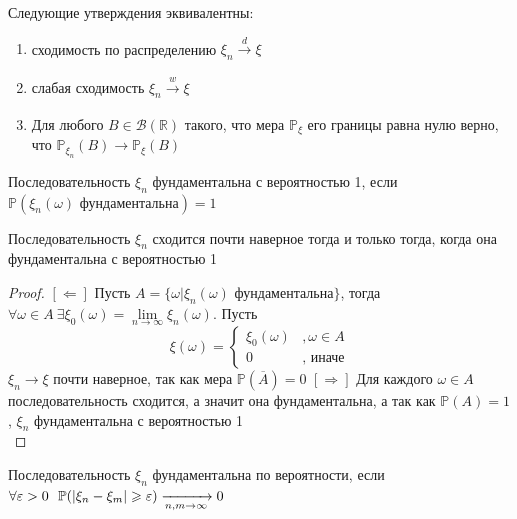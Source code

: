 \begin{theorem}[Александрова(б/д)]
Следующие утверждения эквивалентны:
\begin{enumerate}
    \item сходимость по распределению $\xi_n \xrightarrow[]{d} \xi$
    \item слабая сходимость $\xi_n \xrightarrow[]{w} \xi$ 
    \item Для любого $B \in \mathcal{B}(\mathbb{R})$ такого, что мера $\mathbb{P}_\xi$ его границы равна нулю верно, что $\mathbb{P}_{\xi_n}(B) \to \mathbb{P}_\xi(B)$
\end{enumerate}
\end{theorem}

\begin{definition}
Последовательность $\xi_n$ фундаментальна с вероятностью 1, если \newline $\mathbb{P}(\xi_n(\omega) \text{ фундаментальна}) = 1$
\end{definition}
\begin{theorem}
Последовательность $\xi_n$ сходится почти наверное тогда и только тогда, когда она фундаментальна с вероятностью 1
\end{theorem}

\begin{proof}
$[\Longleftarrow]$ Пусть $A = \{\omega| \xi_n(\omega) \text{ фундаментальна}\}$, тогда $\forall \omega \in A \ \exists \xi_0(\omega)=\lim\limits_{n \to \infty} \xi_n(\omega)$. Пусть 
$$
\xi(\omega) = 
\begin{cases}
\xi_0(\omega) &, \omega \in A \\
0 &, \text{ иначе}
\end{cases}
$$
$\xi_n \to \xi$ почти наверное, так как мера $\mathbb{P}(\overline{A}) = 0$
$[\Longrightarrow]$ Для каждого $\omega \in A$ последовательность сходится, а значит она фундаментальна, а так как $\mathbb{P}(A) = 1$, $\xi_n$ фундаментальна с вероятностью 1 \\
\end{proof}

\begin{definition}
Последовательность $\xi_n$ фундаментальна по вероятности, если \\
$\forall \varepsilon > 0 \ \ \mathbb{P}(|\xi_n - \xi_m| \geqslant \varepsilon) \xrightarrow[n, m \to \infty]{} 0$
\end{definition}

